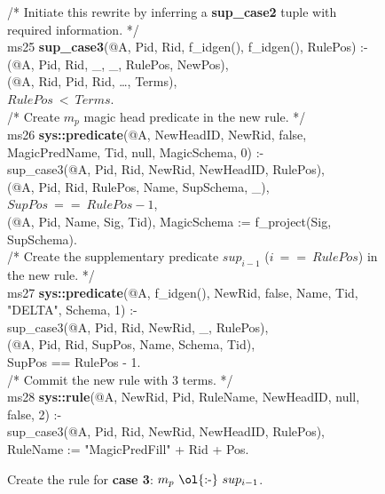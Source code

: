 \begin{figure}[!t]
\ssp
\centering
\begin{boxedminipage}{\linewidth}
/* Initiate this rewrite by inferring a {\bf sup\_case2} tuple with required information. */ \\
ms25 {\bf sup\_case3}(@A, Pid, Rid, f\_idgen(), f\_idgen(), RulePos) :- \\
(@A, Pid, Rid, \_, \_, RulePos, NewPos), \\
(@A, Rid, Pid, Rid, \ldots, Terms), \\
\datalogspace $RulePos\ <\ Terms$. \\
	
/* Create $m_p$ magic head predicate in the new rule. */ \\
ms26 {\bf sys::predicate}(@A, NewHeadID, NewRid, false, MagicPredName, Tid, null, MagicSchema, 0) :- \\
\datalogspace sup\_case3(@A, Pid, Rid, NewRid, NewHeadID, RulePos), \\
(@A, Pid, Rid, RulePos, Name, SupSchema, \_), \\
\datalogspace $SupPos\ ==\ RulePos - 1$, \\
(@A, Pid, Name, Sig, Tid),
\datalogspace MagicSchema := f\_project(Sig, SupSchema).\\
	
/* Create the supplementary predicate $sup_{i-1}$ ($i\ ==\ RulePos$) in the new rule. */ \\
ms27 {\bf sys::predicate}(@A, f\_idgen(), NewRid, false, Name, Tid, "DELTA", Schema, 1) :- \\
\datalogspace sup\_case3(@A, Pid, Rid, NewRid, \_, RulePos), \\
(@A, Pid, Rid, SupPos, Name, Schema, Tid), \\
\datalogspace SupPos == RulePos - 1. \\

/* Commit the new rule with $3$ terms. */ \\
ms28 {\bf sys::rule}(@A, NewRid, Pid, RuleName, NewHeadID, null, false, 2) :- \\
\datalogspace sup\_case3(@A, Pid, Rid, NewRid, NewHeadID, RulePos), \\
\datalogspace RuleName := "MagicPredFill" + Rid + Pos.

\end{boxedminipage}
\caption{\label{ch:magic:fig:rewrite6} 
Create the rule for {\bf case 3}: $m_p\ \text{\ol{:-}}\ sup_{i-1}$. } 
\end{figure}

